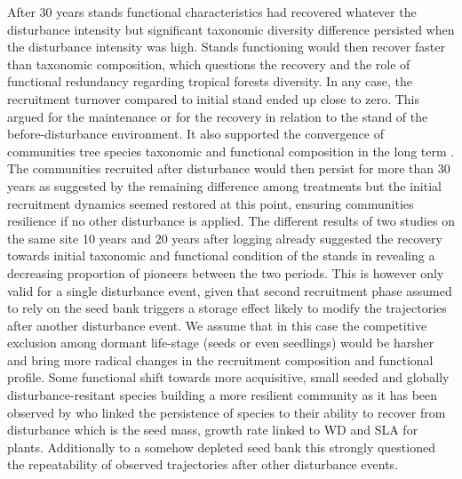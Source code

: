 \documentclass[fleqn,10pt]{ArtEcoFoG} %
\begin{document}
After 30 years stands functional characteristics had recovered whatever
the disturbance intensity but significant taxonomic diversity difference
persisted when the disturbance intensity was high. Stands functioning
would then recover faster than taxonomic composition, which questions
the recovery and the role of functional redundancy regarding tropical
forests diversity. In any case, the recruitment turnover compared to
initial stand ended up close to zero. This argued for the maintenance or
for the recovery in relation to the stand \citep{Anderson2007} of the
before-disturbance environment. It also supported the convergence of
communities tree species taxonomic and functional composition in the
long term \citep{Li2016}. The communities recruited after disturbance
would then persist for more than 30 years as suggested by the remaining
difference among treatments but the initial recruitment dynamics seemed
restored at this point, ensuring communities resilience if no other
disturbance is applied. The different results of two studies on the same
site 10 years \citep{Molino2001} and 20 years \citep{Baraloto2012a}
after logging already suggested the recovery towards initial taxonomic
and functional condition of the stands in revealing a decreasing
proportion of pioneers between the two periods. This is however only
valid for a single disturbance event, given that second recruitment
phase assumed to rely on the seed bank triggers a storage effect likely
to modify the trajectories after another disturbance event. We assume
that in this case the competitive exclusion among dormant life-stage
(seeds or even seedlings) would be harsher and bring more radical
changes in the recruitment composition and functional profile. Some
functional shift towards more acquisitive, small seeded and globally
disturbance-resitant species building a more resilient community as it
has been observed by \citet{Haddad2008} who linked the persistence of
species to their ability to recover from disturbance which is the seed
mass, growth rate linked to WD and SLA for plants. Additionally to a
somehow depleted seed bank this strongly questioned the repeatability of
observed trajectories after other disturbance events.
\end{document}
